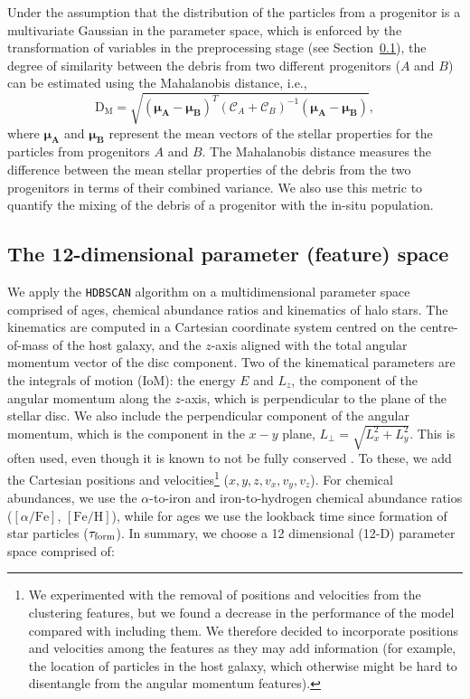 Under the assumption that the distribution of the particles from a progenitor is a multivariate Gaussian in the parameter space, which is enforced by the transformation of variables in the preprocessing stage (see Section~\ref{sec:clustering_approach}), the degree of similarity between the debris from two different progenitors ($A$ and $B$) can be estimated using the Mahalanobis distance, i.e.,
\begin{equation*}
    \mathrm{D_{M}} = \sqrt{(\mathbf{\mu_{A}}-\mathbf{\mu_{B}})^{T}(\mathcal{C}_{A}+\mathcal{C}_{B})^{-1}(\mathbf{\mu_{A}}-\mathbf{\mu_{B}})},
\end{equation*}
where $\mathbf{\mu_{A}}$ and $\mathbf{\mu_{B}}$ represent the mean vectors of the stellar properties for the particles from progenitors $A$ and $B$. The Mahalanobis distance measures the difference between the mean stellar properties of the debris from the two progenitors in terms of their combined variance. We also use this metric to quantify the mixing of the debris of a progenitor with the in-situ population.


\subsection{The 12-dimensional parameter (feature) space}
\label{sec:clustering_approach}


We apply the \texttt{HDBSCAN} algorithm on a multidimensional parameter space comprised of ages, chemical abundance ratios and kinematics of halo stars.
The kinematics are computed in a Cartesian coordinate system centred on the centre-of-mass of the host galaxy, and the $z$-axis aligned with the total angular momentum vector of the disc component. Two of the kinematical parameters are the integrals of motion (IoM): the energy $E$ and $L_{z}$, the component of the angular momentum along the $z$-axis, which is perpendicular to the plane of the stellar disc. We also include the perpendicular component of the angular momentum, which is the component in the $x-y$ plane, $L_{\perp}=\sqrt{L_{x}^{2}+L_{y}^2}$. This is often used, even though it is known to not be fully conserved \citep{Helmi1999b}. To these, we add the Cartesian positions and velocities\footnote{We experimented with the removal of positions and velocities from the clustering features, but we found a decrease in the performance of the model compared with including them. We therefore decided to incorporate positions and velocities among the features as they may add information (for example, the location of particles in the host galaxy, which otherwise might be hard to disentangle from the angular momentum features).} ($x,y,z,v_{x},v_{y},v_{z}$). For chemical abundances, we use the $\alpha$-to-iron and iron-to-hydrogen chemical abundance ratios ($[\alpha/\mathrm{Fe}]$, $[\mathrm{Fe/H}]$), while for ages we use the lookback time since formation of star particles ($\tau_{\rm form}$). In summary, we choose a 12 dimensional (12-D) parameter space comprised of:

